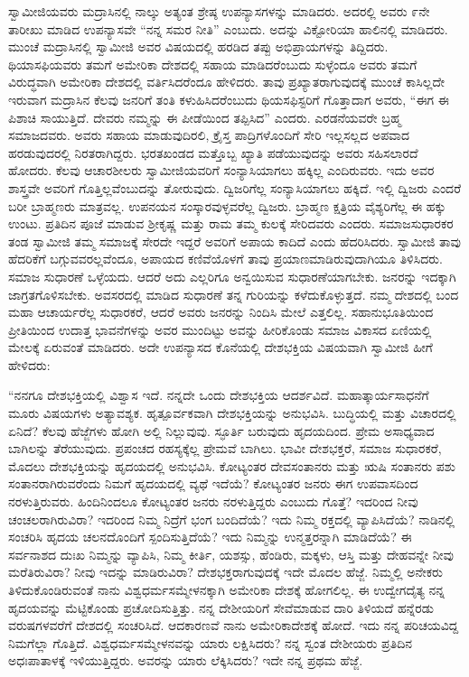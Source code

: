 ಸ್ವಾಮೀಜಿಯವರು ಮದ್ರಾಸಿನಲ್ಲಿ ನಾಲ್ಕು ಅತ್ಯಂತ ಶ್ರೇಷ್ಠ ಉಪನ್ಯಾಸಗಳನ್ನು ಮಾಡಿದರು. ಅದರಲ್ಲಿ ಅವರು ೯ನೇ ತಾರೀಖು ಮಾಡಿದ ಉಪನ್ಯಾಸವೇ “ನನ್ನ ಸಮರ ನೀತಿ” ಎಂಬುದು. ಅದನ್ನು ವಿಕ್ಟೋರಿಯಾ ಹಾಲಿನಲ್ಲಿ ಮಾಡಿದರು. ಮುಂಚೆ ಮದ್ರಾಸಿನಲ್ಲಿ ಸ್ವಾಮೀಜಿ ಅವರ ವಿಷಯದಲ್ಲಿ ಹರಡಿದ ತಪ್ಪು ಅಭಿಪ್ರಾಯಗಳನ್ನು ತಿದ್ದಿದರು. ಥಿಯಾಸಫಿಯವರು ತಮಗೆ ಅಮೇರಿಕಾ ದೇಶದಲ್ಲಿ ಸಹಾಯ ಮಾಡಿದರೆಂಬುದು ಸುಳ್ಳೆಂದೂ ಅವರು ತಮಗೆ ವಿರುದ್ಧವಾಗಿ ಅಮೇರಿಕಾ ದೇಶದಲ್ಲಿ ವರ್ತಿಸಿದರೆಂದೂ ಹೇಳಿದರು. ತಾವು ಪ್ರಖ್ಯಾತರಾಗುವುದಕ್ಕೆ ಮುಂಚೆ ಕಾಸಿಲ್ಲದೇ ಇರುವಾಗ ಮದ್ರಾಸಿನ ಕೆಲವು ಜನರಿಗೆ ತಂತಿ ಕಳುಹಿಸಿದರೆಂಬುದು ಥಿಯಸಫಿಸ್ಟರಿಗೆ ಗೊತ್ತಾದಾಗ ಅವರು, “ಈಗ ಈ ಪಿಶಾಚಿ ಸಾಯುತ್ತಿದೆ. ದೇವರು ನಮ್ಮನ್ನು ಈ ಪೀಡೆಯಿಂದ ತಪ್ಪಿಸಿದ” ಎಂದರು. ಎರಡನೆಯವರೇ ಬ್ರಹ್ಮ ಸಮಾಜದವರು. ಅವರು ಸಹಾಯ ಮಾಡುವುದಿರಲಿ, ಕ್ರೈಸ್ತ ಪಾದ್ರಿಗಳೊಂದಿಗೆ ಸೇರಿ ಇಲ್ಲಸಲ್ಲದ ಅಪವಾದ ಹರಡುವುದರಲ್ಲಿ ನಿರತರಾಗಿದ್ದರು. ಭರತಖಂಡದ ಮತ್ತೊಬ್ಬ ಖ್ಯಾತಿ ಪಡೆಯುವುದನ್ನು ಅವರು ಸಹಿಸಲಾರದೆ ಹೋದರು. ಕೆಲವು ಆಚಾರಶೀಲರು ಸ್ವಾಮೀಜಿಯವರಿಗೆ ಸಂನ್ಯಾಸಿಯಾಗಲು ಹಕ್ಕಿಲ್ಲ ಎಂದಿರುವರು. ಇದು ಅವರ ಶಾಸ್ತ್ರವೇ ಅವರಿಗೆ ಗೊತ್ತಿಲ್ಲವೆಂಬುದನ್ನು ತೋರುವುದು. ದ್ವಿಜರಿಗೆಲ್ಲ ಸಂನ್ಯಾಸಿಯಾಗಲು ಹಕ್ಕಿದೆ. ಇಲ್ಲಿ ದ್ವಿಜರು ಎಂದರೆ ಬರೀ ಬ್ರಾಹ್ಮಣರು ಮಾತ್ರವಲ್ಲ. ಉಪನಯನ ಸಂಸ್ಕಾರವುಳ್ಳವರೆಲ್ಲ ದ್ವಿಜರು. ಬ್ರಾಹ್ಮಣ ಕ್ಷತ್ರಿಯ ವೈಶ್ಯರಿಗೆಲ್ಲ ಈ ಹಕ್ಕು ಉಂಟು. ಪ್ರತಿದಿನ ಪೂಜೆ ಮಾಡುವ ಶ‍್ರೀಕೃಷ್ಣ ಮತ್ತು ರಾಮ ತಮ್ಮ ಕುಲಕ್ಕೆ ಸೇರಿದವರು ಎಂದರು. ಸಮಾಜಸುಧಾರಕರ ತಂಡ ಸ್ವಾಮೀಜಿ ತಮ್ಮ ಸಮಾಜಕ್ಕೆ ಸೇರದೇ ಇದ್ದರೆ ಅವರಿಗೆ ಅಪಾಯ ಕಾದಿದೆ ಎಂದು ಹೆದರಿಸಿದರು. ಸ್ವಾಮೀಜಿ ತಾವು ಹೆದರಿಕೆಗೆ ಬಗ್ಗುವವರಲ್ಲವೆಂದೂ, ಅಪಾಯದ ಕಣಿವೆಯೊಳಗೆ ತಾವು ಪ್ರಯಾಣಮಾಡಿರುವುದಾಗಿಯೂ ತಿಳಿಸಿದರು. ಸಮಾಜ ಸುಧಾರಣೆ ಒಳ್ಳೆಯದು. ಆದರೆ ಅದು ಎಲ್ಲರಿಗೂ ಅನ್ವಯಿಸುವ ಸುಧಾರಣೆಯಾಗಬೇಕು. ಜನರನ್ನು ಇದಕ್ಕಾಗಿ ಜಾಗ್ರತಗೊಳಿಸಬೇಕು. ಅವಸರದಲ್ಲಿ ಮಾಡಿದ ಸುಧಾರಣೆ ತನ್ನ ಗುರಿಯನ್ನು ಕಳೆದುಕೊಳ್ಳುತ್ತದೆ. ನಮ್ಮ ದೇಶದಲ್ಲಿ ಬಂದ ಮಹಾ ಆಚಾರ್ಯರೆಲ್ಲ ಸುಧಾರಕರೆ, ಆದರೆ ಅವರು ಜನರನ್ನು ನಿಂದಿಸಿ ಮೇಲೆ ಎತ್ತಲಿಲ್ಲ. ಸಹಾನುಭೂತಿಯಿಂದ ಪ್ರೀತಿಯಿಂದ ಉದಾತ್ತ ಭಾವನೆಗಳನ್ನು ಅವರ ಮುಂದಿಟ್ಟು ಅವನ್ನು ಹೀರಿಕೊಂಡು ಸಮಾಜ ವಿಕಾಸದ ಏಣಿಯಲ್ಲಿ ಮೇಲಕ್ಕೆ ಏರುವಂತೆ ಮಾಡಿದರು. ಅದೇ ಉಪನ್ಯಾಸದ ಕೊನೆಯಲ್ಲಿ ದೇಶಭಕ್ತಿಯ ವಿಷಯವಾಗಿ ಸ್ವಾಮೀಜಿ ಹೀಗೆ ಹೇಳಿದರು: 

 “ನನಗೂ ದೇಶಭಕ್ತಿಯಲ್ಲಿ ವಿಶ್ವಾಸ ಇದೆ. ನನ್ನದೇ ಒಂದು ದೇಶಭಕ್ತಿಯ ಆದರ್ಶವಿದೆ. ಮಹಾತ್ಕಾರ್ಯಸಾಧನೆಗೆ ಮೂರು ವಿಷಯಗಳು ಅತ್ಯಾವಶ್ಯಕ. ಹೃತ್ಪೂರ್ವಕವಾಗಿ ದೇಶಭಕ್ತಿಯನ್ನು ಅನುಭವಿಸಿ. ಬುದ್ಧಿಯಲ್ಲಿ ಮತ್ತು ವಿಚಾರದಲ್ಲಿ ಏನಿದೆ? ಕೆಲವು ಹೆಜ್ಜೆಗಳು ಹೋಗಿ ಅಲ್ಲಿ ನಿಲ್ಲುವುವು. ಸ್ಫೂರ್ತಿ ಬರುವುದು ಹೃದಯದಿಂದ. ಪ್ರೇಮ ಅಸಾಧ್ಯವಾದ ಬಾಗಿಲನ್ನು ತೆರೆಯುವುದು. ಪ್ರಪಂಚದ ರಹಸ್ಯಕ್ಕೆಲ್ಲ ಪ್ರೇಮವೆ ಬಾಗಿಲು. ಭಾವೀ ದೇಶಭಕ್ತರೆ, ಸಮಾಜ ಸುಧಾರಕರೆ, ಮೊದಲು ದೇಶಭಕ್ತಿಯನ್ನು ಹೃದಯದಲ್ಲಿ ಅನುಭವಿಸಿ. ಕೋಟ್ಯಂತರ ದೇವಸಂತಾನರು ಮತ್ತು ಋಷಿ ಸಂತಾನರು ಪಶು ಸಂತಾನರಾಗಿರುವರೆಂದು ನಿಮಗೆ ಹೃದಯದಲ್ಲಿ ವ್ಯಥೆ ಇದೆಯೆ?‌ ಕೋಟ್ಯಂತರ ಜನರು ಈಗ ಉಪವಾಸದಿಂದ ನರಳುತ್ತಿರುವರು. ಹಿಂದಿನಿಂದಲೂ ಕೋಟ್ಯಂತರ ಜನರು ನರಳುತ್ತಿದ್ದರು ಎಂಬುದು ಗೊತ್ತೆ? ಇದರಿಂದ ನೀವು ಚಂಚಲರಾಗಿರುವಿರಾ? ಇದರಿಂದ ನಿಮ್ಮ ನಿದ್ರೆಗೆ ಭಂಗ ಬಂದಿದೆಯೆ? ಇದು ನಿಮ್ಮ ರಕ್ತದಲ್ಲಿ ವ್ಯಾಪಿಸಿದೆಯೆ? ನಾಡಿನಲ್ಲಿ ಸಂಚರಿಸಿ ಹೃದಯ ಚಲನದೊಂದಿಗೆ ಸ್ಪಂದಿಸುತ್ತಿದೆಯೆ? ಇದು ನಿಮ್ಮನ್ನು ಉನ್ಮತ್ತರನ್ನಾಗಿ ಮಾಡಿದೆಯೆ? ಈ ಸರ್ವನಾಶದ ದುಃಖ ನಿಮ್ಮನ್ನು ವ್ಯಾಪಿಸಿ, ನಿಮ್ಮ ಕೀರ್ತಿ, ಯಶಸ್ಸು, ಹೆಂಡಿರು, ಮಕ್ಕಳು, ಆಸ್ತಿ ಮತ್ತು ದೇಹವನ್ನೇ ನೀವು ಮರೆತಿರುವಿರಾ? ನೀವು ಇದನ್ನು ಮಾಡಿರುವಿರಾ? ದೇಶಭಕ್ತರಾಗುವುದಕ್ಕೆ ಇದೇ ಮೊದಲ ಹೆಜ್ಜೆ. ನಿಮ್ಮಲ್ಲಿ ಅನೇಕರು ತಿಳಿದುಕೊಂಡಿರುವಂತೆ ನಾನು ವಿಶ್ವಧರ್ಮಸಮ್ಮೇಳನಕ್ಕಾಗಿ ಅಮೇರಿಕಾ ದೇಶಕ್ಕೆ ಹೋಗಲಿಲ್ಲ. ಈ ಉದ್ವೇಗದೈತ್ಯ ನನ್ನ ಹೃದಯವನ್ನು ಮೆಟ್ಟಿಕೊಂಡು ಪ್ರಚೋದಿಸುತ್ತಿತ್ತು. ನನ್ನ ದೇಶೀಯರಿಗೆ ಸೇವೆಮಾಡುವ ದಾರಿ ತಿಳಿಯದೆ ಹನ್ನೆರಡು ವರುಷಗಳವರೆಗೆ ದೇಶದಲ್ಲಿ ಸಂಚರಿಸಿದೆ. ಆದಕಾರಣವೆ ನಾನು ಅಮೇರಿಕಾದೇಶಕ್ಕೆ ಹೋದೆ. ಇದು ನನ್ನ ಪರಿಚಯವಿದ್ದ ನಿಮಗೆಲ್ಲಾ ಗೊತ್ತಿದೆ. ವಿಶ್ವಧರ್ಮಸಮ್ಮೇಳನವನ್ನು ಯಾರು ಲಕ್ಷಿಸಿದರು? ನನ್ನ ಸ್ವಂತ ದೇಶೀಯರು ಪ್ರತಿದಿನ ಅಧಃಪಾತಾಳಕ್ಕೆ ಇಳಿಯುತ್ತಿದ್ದರು. ಅವರನ್ನು ಯಾರು ಲೆಕ್ಕಿಸಿದರು? ಇದೇ ನನ್ನ ಪ್ರಥಮ ಹೆಜ್ಜೆ. 

